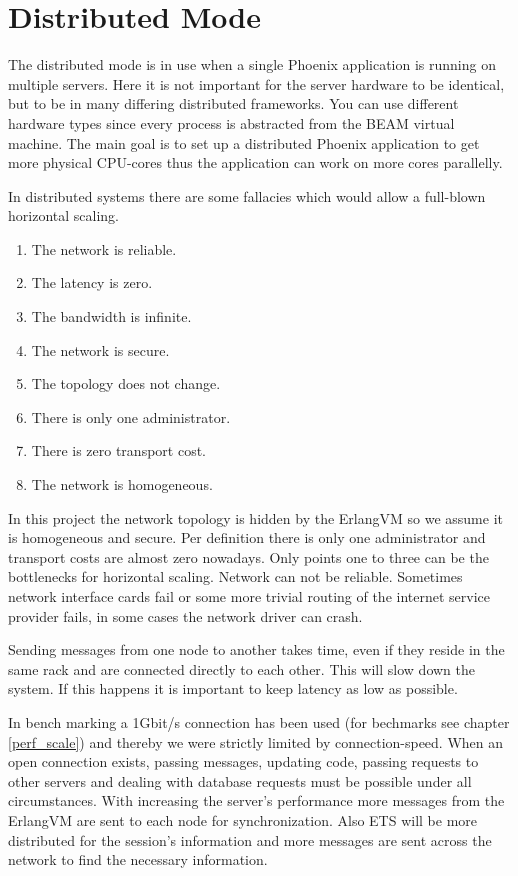 
\section{Distributed Mode} \label{distribued_mode}
The distributed mode is in use when a single Phoenix application is running on multiple servers. Here it is not important for the server hardware to be identical, but to be in many differing distributed frameworks. You can use different hardware types since every process is abstracted from the BEAM virtual machine. The main goal is to set up a distributed Phoenix application to get more physical CPU-cores thus the application can work on more cores parallelly.

In distributed systems there are some fallacies which would allow a full-blown horizontal scaling. 
\begin{enumerate}
\item The network is reliable.
\item The latency is zero.
\item The bandwidth is infinite.
\item The network is secure.
\item The topology does not change.
\item There is only one administrator.
\item There is zero transport cost.
\item The network is homogeneous.
\end{enumerate}
\cite{PD001}
In this project the network topology is hidden by the ErlangVM so we assume it is homogeneous and secure. Per definition there is only one administrator and transport costs are almost zero nowadays. Only points one to three can be the bottlenecks for horizontal scaling.
Network can not be reliable. Sometimes network interface cards fail or some more trivial routing of the internet service provider fails, in some cases the network driver can crash.\cite{JH2007}

 Sending messages from one node to another takes time, even if they reside in the same rack and are connected directly to each other. This will slow down the system. If this happens it is important to keep latency as low as possible. 
 
In bench marking a 1Gbit/s connection has been used (for bechmarks see chapter \ref{perf_scale}) and thereby we were strictly limited by connection-speed. When an open  connection exists, passing messages, updating code, passing requests to other servers and dealing with database requests must be possible under all circumstances. With increasing the server's performance more messages from the ErlangVM are sent to each node for synchronization. Also ETS will be more distributed for the session's information and more messages are sent across the network to find the necessary information. 

